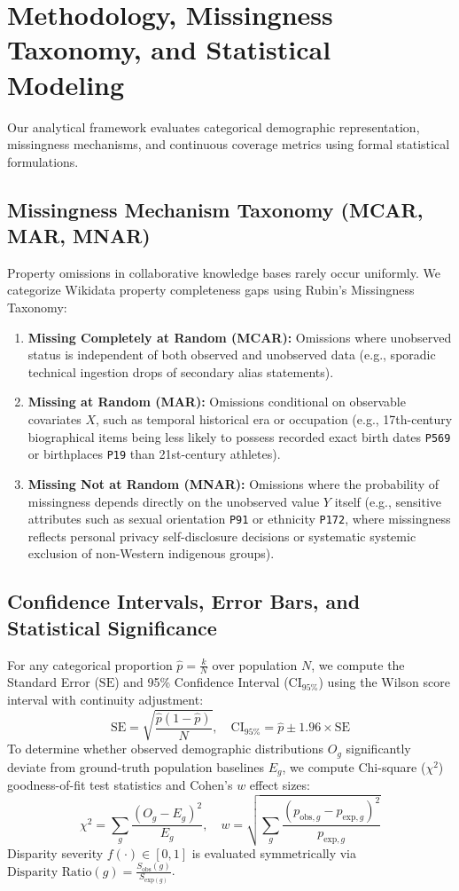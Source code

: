 \documentclass[11pt,a4paper]{article}
\begin{document}
\section{Methodology, Missingness Taxonomy, and Statistical Modeling}
Our analytical framework evaluates categorical demographic representation, missingness mechanisms, and continuous coverage metrics using formal statistical formulations.

\subsection{Missingness Mechanism Taxonomy (MCAR, MAR, MNAR)}
Property omissions in collaborative knowledge bases rarely occur uniformly. We categorize Wikidata property completeness gaps using Rubin's Missingness Taxonomy:
\begin{enumerate}
    \item \textbf{Missing Completely at Random (MCAR):} Omissions where unobserved status is independent of both observed and unobserved data (e.g., sporadic technical ingestion drops of secondary alias statements).
    \item \textbf{Missing at Random (MAR):} Omissions conditional on observable covariates $X$, such as temporal historical era or occupation (e.g., 17th-century biographical items being less likely to possess recorded exact birth dates \texttt{P569} or birthplaces \texttt{P19} than 21st-century athletes).
    \item \textbf{Missing Not at Random (MNAR):} Omissions where the probability of missingness depends directly on the unobserved value $Y$ itself (e.g., sensitive attributes such as sexual orientation \texttt{P91} or ethnicity \texttt{P172}, where missingness reflects personal privacy self-disclosure decisions or systematic systemic exclusion of non-Western indigenous groups).
\end{enumerate}

\subsection{Confidence Intervals, Error Bars, and Statistical Significance}
For any categorical proportion $\hat{p} = \frac{k}{N}$ over population $N$, we compute the Standard Error ($\text{SE}$) and 95\% Confidence Interval ($\text{CI}_{95\%}$) using the Wilson score interval with continuity adjustment:
\begin{equation}
    \text{SE} = \sqrt{\frac{\hat{p}(1 - \hat{p})}{N}}, \quad \text{CI}_{95\%} = \hat{p} \pm 1.96 \times \text{SE}
\end{equation}
To determine whether observed demographic distributions $O_g$ significantly deviate from ground-truth population baselines $E_g$, we compute Chi-square ($\chi^2$) goodness-of-fit test statistics and Cohen's $w$ effect sizes:
\begin{equation}
    \chi^2 = \sum_{g} \frac{(O_g - E_g)^2}{E_g}, \quad w = \sqrt{\sum_{g} \frac{(p_{\text{obs},g} - p_{\text{exp},g})^2}{p_{\text{exp},g}}}
\end{equation}
Disparity severity $f(\cdot) \in [0, 1]$ is evaluated symmetrically via $\text{Disparity Ratio}(g) = \frac{S_{\text{obs}}(g)}{S_{\text{exp}(g)}}$.
\end{document}
